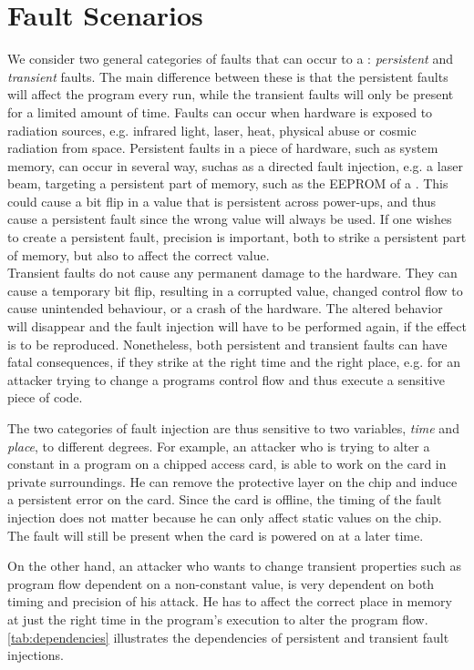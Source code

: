 \section{Fault Scenarios}
We consider two general categories of faults that can occur to a \jc: \textit{persistent} and \textit{transient} faults. The main difference between these is that the persistent faults will affect the program every run, while the transient faults will only be present for a limited amount of time. Faults can occur when hardware is exposed to radiation sources, e.g. infrared light, laser, heat, physical abuse or cosmic radiation from space. 
Persistent faults in a piece of hardware, such as system memory, can occur in several way, suchas as a directed fault injection, e.g. a laser beam, targeting a persistent part of memory, such as the EEPROM of a \jc. This could cause a bit flip in a value that is persistent across power-ups, and thus cause a persistent fault since the wrong value will always be used. If one wishes to create a persistent fault, precision is important, both to strike a persistent part of memory, but also to affect the correct value.\\


Transient faults do not cause any permanent damage to the hardware. They can cause a temporary bit flip, resulting in a corrupted value, changed control flow to cause unintended behaviour, or a crash of the hardware. The altered behavior will disappear and the fault injection will have to be performed again, if the effect is to be reproduced.
Nonetheless, both persistent and transient faults can have fatal consequences, if they strike at the right time and the right place, e.g. for an attacker trying to change a programs control flow and thus execute a sensitive piece of code. 

The two categories of fault injection are thus sensitive to two variables, \textit{time} and \textit{place}, to different degrees. For example, an attacker who is trying to alter a constant in a program on a chipped access card, is able to work on the card in private surroundings. He can remove the protective layer on the chip and induce a persistent error on the card. Since the card is offline, the timing of the fault injection does not matter because he can only affect static values on the chip. The fault will still be present when the card is powered on at a later time. 

On the other hand, an attacker who wants to change transient properties such as program flow dependent on a non-constant value, is very dependent on both timing and precision of his attack. He has to affect the correct place in memory at just the right time in the program's execution to alter the program flow. \cref{tab:dependencies} illustrates the dependencies of persistent and transient fault injections.

